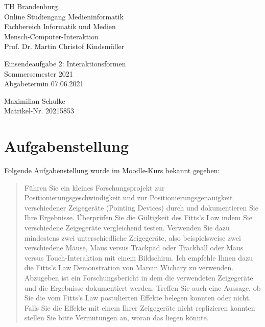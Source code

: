 \documentclass{article}
\begin{document}
\begin{titlepage}
	\begin{flushleft}
		TH Brandenburg \\
		Online Studiengang Medieninformatik \\
		Fachbereich Informatik und Medien \\
		Mensch-Computer-Interaktion \\
		Prof. Dr. Martin Christof Kindsmüller
	\end{flushleft}

	\vfill

	\begin{center}
		\Large{Einsendeaufgabe 2: Interaktionsformen}\\[0.5em]
		\large{Sommersemester 2021}\\[0.25em]
		\large{Abgabetermin 07.06.2021}
	\end{center}

	\vfill

	\begin{flushright}
		Maximilian Schulke \\
		Matrikel-Nr. 20215853
	\end{flushright}
\end{titlepage}

\section{Aufgabenstellung}

Folgende Aufgabenstellung wurde im Moodle-Kurs bekannt gegeben:

\begin{quote}
	Führen Sie ein kleines Forschungsprojekt zur Positionierungsgeschwindigkeit
	und zur Positionierungsgenauigkeit verschiedener Zeigegeräte (Pointing
	Devices) durch und dokumentieren Sie Ihre Ergebnisse. Überprüfen Sie die
	Gültigkeit des Fitts's Law indem Sie verschiedene Zeigegeräte vergleichend
	testen. Verwenden Sie dazu mindestens zwei unterschiedliche Zeigegeräte,
	also beispielsweise zwei verschiedene Mäuse, Maus versus Trackpad oder
	Trackball oder Maus versus Touch-Interaktion mit einem Bildschirm. Ich
	empfehle Ihnen dazu die Fitts's Law Demonstration von Marcin Wichary zu
	verwenden. Abzugeben ist ein Forschungsbericht in dem die verwendeten
	Zeigegeräte und die Ergebnisse dokumentiert werden. Treffen Sie auch eine
	Aussage, ob Sie die vom Fitts's Law postulierten Effekte belegen konnten
	oder nicht. Falls Sie die Effekte mit einem Ihrer Zeigegeräte nicht
	replizieren konnten stellen Sie bitte Vermutungen an, woran das liegen
	könnte.
\end{quote}
\end{document}
